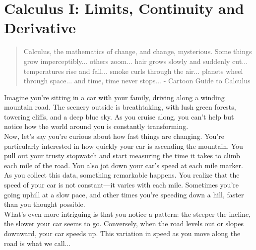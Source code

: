 \chapter{Calculus I: Limits, Continuity and Derivative}
\begin{quote}
    Calculus, the mathematics of change, and change, mysterious. Some things grow imperceptibly... others zoom... hair grows slowly and suddenly cut... temperatures rise and fall... smoke curls through the air... planets wheel through space... and time, time never stops... - Cartoon Guide to Calculus
\end{quote}
Imagine you're sitting in a car with your family, driving along a winding mountain road. The scenery outside is breathtaking, with lush green forests, towering cliffs, and a deep blue sky. As you cruise along, you can't help but notice how the world around you is constantly transforming.\\
Now, let's say you're curious about how fast things are changing. You're particularly interested in how quickly your car is ascending the mountain. You pull out your trusty stopwatch and start measuring the time it takes to climb each mile of the road. You also jot down your car's speed at each mile marker.\\
As you collect this data, something remarkable happens. You realize that the speed of your car is not constant—it varies with each mile. Sometimes you're going uphill at a slow pace, and other times you're speeding down a hill, faster than you thought possible.\\
What's even more intriguing is that you notice a pattern: the steeper the incline, the slower your car seems to go. Conversely, when the road levels out or slopes downward, your car speeds up. This variation in speed as you move along the road is what we call...\\
